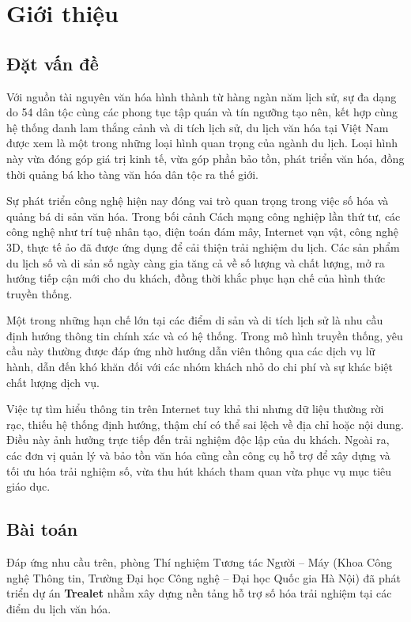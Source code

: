 \chapter{Giới thiệu}

\setcounter{page}{1}
\section{Đặt vấn đề}

Với nguồn tài nguyên văn hóa hình thành từ hàng ngàn năm lịch sử, sự đa dạng do 54 dân tộc cùng các phong tục tập quán và tín ngưỡng tạo nên, kết hợp cùng hệ thống danh lam thắng cảnh và di tích lịch sử, du lịch văn hóa tại Việt Nam được xem là một trong những loại hình quan trọng của ngành du lịch. Loại hình này vừa đóng góp giá trị kinh tế, vừa góp phần bảo tồn, phát triển văn hóa, đồng thời quảng bá kho tàng văn hóa dân tộc ra thế giới.  

Sự phát triển công nghệ hiện nay đóng vai trò quan trọng trong việc số hóa và quảng bá di sản văn hóa. Trong bối cảnh Cách mạng công nghiệp lần thứ tư, các công nghệ như trí tuệ nhân tạo, điện toán đám mây, Internet vạn vật, công nghệ 3D, thực tế ảo đã được ứng dụng để cải thiện trải nghiệm du lịch. Các sản phẩm du lịch số và di sản số ngày càng gia tăng cả về số lượng và chất lượng, mở ra hướng tiếp cận mới cho du khách, đồng thời khắc phục hạn chế của hình thức truyền thống.  

Một trong những hạn chế lớn tại các điểm di sản và di tích lịch sử là nhu cầu định hướng thông tin chính xác và có hệ thống. Trong mô hình truyền thống, yêu cầu này thường được đáp ứng nhờ hướng dẫn viên thông qua các dịch vụ lữ hành, dẫn đến khó khăn đối với các nhóm khách nhỏ do chi phí và sự khác biệt chất lượng dịch vụ.  

Việc tự tìm hiểu thông tin trên Internet tuy khả thi nhưng dữ liệu thường rời rạc, thiếu hệ thống định hướng, thậm chí có thể sai lệch về địa chỉ hoặc nội dung. Điều này ảnh hưởng trực tiếp đến trải nghiệm độc lập của du khách. Ngoài ra, các đơn vị quản lý và bảo tồn văn hóa cũng cần công cụ hỗ trợ để xây dựng và tối ưu hóa trải nghiệm số, vừa thu hút khách tham quan vừa phục vụ mục tiêu giáo dục.  

\section{Bài toán}

Đáp ứng nhu cầu trên, phòng Thí nghiệm Tương tác Người – Máy (Khoa Công nghệ Thông tin, Trường Đại học Công nghệ – Đại học Quốc gia Hà Nội) đã phát triển dự án \textbf{Trealet} nhằm xây dựng nền tảng hỗ trợ số hóa trải nghiệm tại các điểm du lịch văn hóa.  

